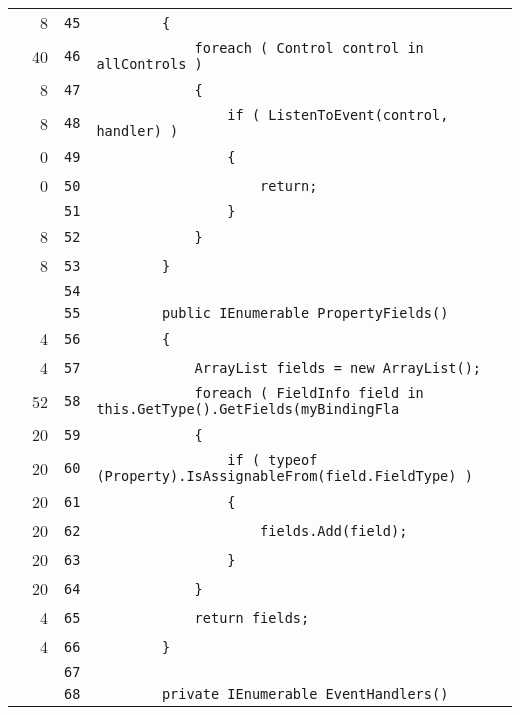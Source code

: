 \documentclass[a4paper,10pt]{article}
\begin{document}
\begin{longtable}[l]{lrrl}
\cellcolor{green} & 8 & \verb~45~ & \verb~        {~\\
\cellcolor{green} & 40 & \verb~46~ & \verb~            foreach ( Control control in allControls )~\\
\cellcolor{green} & 8 & \verb~47~ & \verb~            {~\\
\cellcolor{green} & 8 & \verb~48~ & \verb~                if ( ListenToEvent(control, handler) )~\\
\cellcolor{red} & 0 & \verb~49~ & \verb~                {~\\
\cellcolor{red} & 0 & \verb~50~ & \verb~                    return;~\\
\cellcolor{gray} &  & \verb~51~ & \verb~                }~\\
\cellcolor{green} & 8 & \verb~52~ & \verb~            }~\\
\cellcolor{green} & 8 & \verb~53~ & \verb~        }~\\
\cellcolor{gray} &  & \verb~54~ & \verb~~\\
\cellcolor{gray} &  & \verb~55~ & \verb~        public IEnumerable PropertyFields()~\\
\cellcolor{green} & 4 & \verb~56~ & \verb~        {~\\
\cellcolor{green} & 4 & \verb~57~ & \verb~            ArrayList fields = new ArrayList();~\\
\cellcolor{green} & 52 & \verb~58~ & \verb~            foreach ( FieldInfo field in this.GetType().GetFields(myBindingFla~\\
\cellcolor{green} & 20 & \verb~59~ & \verb~            {~\\
\cellcolor{green} & 20 & \verb~60~ & \verb~                if ( typeof (Property).IsAssignableFrom(field.FieldType) )~\\
\cellcolor{green} & 20 & \verb~61~ & \verb~                {~\\
\cellcolor{green} & 20 & \verb~62~ & \verb~                    fields.Add(field);~\\
\cellcolor{green} & 20 & \verb~63~ & \verb~                }~\\
\cellcolor{green} & 20 & \verb~64~ & \verb~            }~\\
\cellcolor{green} & 4 & \verb~65~ & \verb~            return fields;~\\
\cellcolor{green} & 4 & \verb~66~ & \verb~        }~\\
\cellcolor{gray} &  & \verb~67~ & \verb~~\\
\cellcolor{gray} &  & \verb~68~ & \verb~        private IEnumerable EventHandlers()~\\

\end{longtable}
\end{document}

